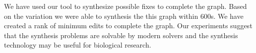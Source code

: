 We have used our tool to synthesize possible fixes to complete the graph. Based on the variation we were able to synthesis the this graph within 600s. We have created a rank of minimum edits to complete the graph. Our experiments suggest that the synthesis problems are solvable by modern solvers and the synthesis technology may be useful for biological research.

